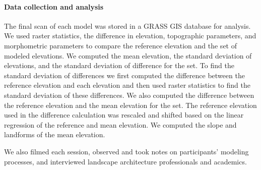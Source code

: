 \documentclass[prodmode,acmtochi]{acmsmall} %
\begin{document}
\paragraph{Data collection and analysis}
The final scan of each model was stored in a GRASS GIS database for analysis. 
We used raster statistics, the difference in elevation, 
topographic parameters, and morphometric parameters
to compare the reference elevation and the set of modeled elevations. 
We computed 
the mean elevation,
the standard deviation of elevations, 
and the standard deviation of difference for the set.
To find the standard deviation of differences 
we first computed the difference between the reference elevation and each elevation 
and then used raster statistics to find the standard deviation of these differences.
We also computed the difference between the 
reference elevation and the mean elevation for the set. 
The reference elevation used in the difference calculation was rescaled and shifted based on the linear regression of the reference and mean elevation.
We computed the slope and landforms of the mean elevation. 

We also filmed each session, 
observed and took notes on participants' modeling processes, 
and interviewed landscape architecture professionals and academics.
\end{document}
